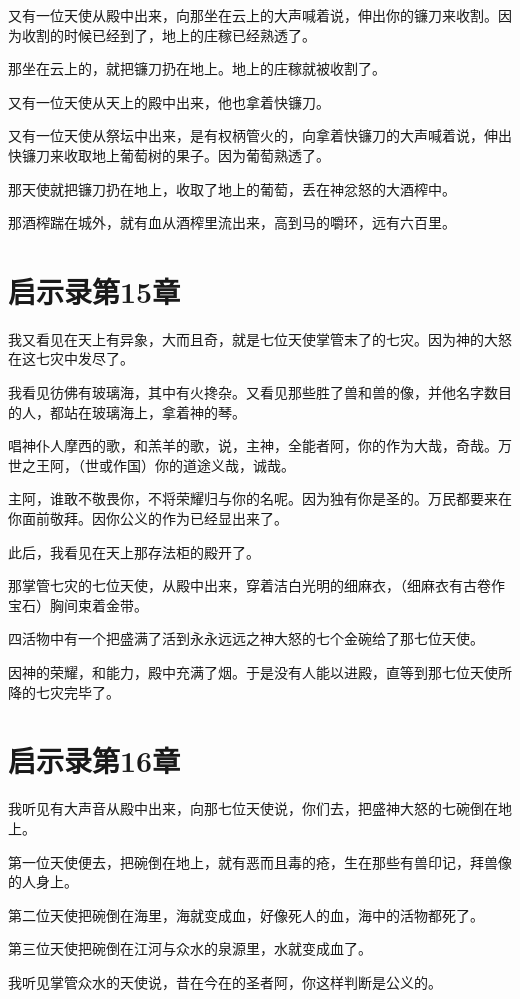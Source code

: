 \documentclass[12pt,oneside]{book}
\begin{document}
又有一位天使从殿中出来，向那坐在云上的大声喊着说，伸出你的镰刀来收割。因为收割的时候已经到了，地上的庄稼已经熟透了。

那坐在云上的，就把镰刀扔在地上。地上的庄稼就被收割了。

又有一位天使从天上的殿中出来，他也拿着快镰刀。

又有一位天使从祭坛中出来，是有权柄管火的，向拿着快镰刀的大声喊着说，伸出快镰刀来收取地上葡萄树的果子。因为葡萄熟透了。

那天使就把镰刀扔在地上，收取了地上的葡萄，丢在神忿怒的大酒榨中。

那酒榨踹在城外，就有血从酒榨里流出来，高到马的嚼环，远有六百里。

\chapter{启示录第15章}
我又看见在天上有异象，大而且奇，就是七位天使掌管末了的七灾。因为神的大怒在这七灾中发尽了。

我看见彷佛有玻璃海，其中有火搀杂。又看见那些胜了兽和兽的像，并他名字数目的人，都站在玻璃海上，拿着神的琴。

唱神仆人摩西的歌，和羔羊的歌，说，主神，全能者阿，你的作为大哉，奇哉。万世之王阿，（世或作国）你的道途义哉，诚哉。

主阿，谁敢不敬畏你，不将荣耀归与你的名呢。因为独有你是圣的。万民都要来在你面前敬拜。因你公义的作为已经显出来了。

此后，我看见在天上那存法柜的殿开了。

那掌管七灾的七位天使，从殿中出来，穿着洁白光明的细麻衣，（细麻衣有古卷作宝石）胸间束着金带。

四活物中有一个把盛满了活到永永远远之神大怒的七个金碗给了那七位天使。

因神的荣耀，和能力，殿中充满了烟。于是没有人能以进殿，直等到那七位天使所降的七灾完毕了。

\chapter{启示录第16章}
我听见有大声音从殿中出来，向那七位天使说，你们去，把盛神大怒的七碗倒在地上。

第一位天使便去，把碗倒在地上，就有恶而且毒的疮，生在那些有兽印记，拜兽像的人身上。

第二位天使把碗倒在海里，海就变成血，好像死人的血，海中的活物都死了。

第三位天使把碗倒在江河与众水的泉源里，水就变成血了。

我听见掌管众水的天使说，昔在今在的圣者阿，你这样判断是公义的。
\end{document}
